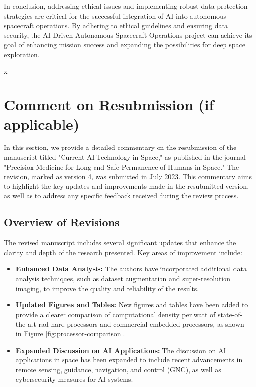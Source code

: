 \documentclass[a4paper,12pt]{article}
\begin{document}
In conclusion, addressing ethical issues and implementing robust data protection strategies are critical for the successful integration of AI into autonomous spacecraft operations. By adhering to ethical guidelines and ensuring data security, the AI-Driven Autonomous Spacecraft Operations project can achieve its goal of enhancing mission success and expanding the possibilities for deep space exploration.






x
\section{Comment on Resubmission (if applicable)}

In this section, we provide a detailed commentary on the resubmission of the manuscript titled "Current AI Technology in Space," as published in the journal "Precision Medicine for Long and Safe Permanence of Humans in Space." The revision, marked as version 4, was submitted in July 2023. This commentary aims to highlight the key updates and improvements made in the resubmitted version, as well as to address any specific feedback received during the review process.

\subsection{Overview of Revisions}

The revised manuscript includes several significant updates that enhance the clarity and depth of the research presented. Key areas of improvement include:

\begin{itemize}
    \item \textbf{Enhanced Data Analysis:} The authors have incorporated additional data analysis techniques, such as dataset augmentation and super-resolution imaging, to improve the quality and reliability of the results.
    \item \textbf{Updated Figures and Tables:} New figures and tables have been added to provide a clearer comparison of computational density per watt of state-of-the-art rad-hard processors and commercial embedded processors, as shown in Figure \ref{fig:processor-comparison}.
    \item \textbf{Expanded Discussion on AI Applications:} The discussion on AI applications in space has been expanded to include recent advancements in remote sensing, guidance, navigation, and control (GNC), as well as cybersecurity measures for AI systems.
\end{itemize}
\end{document}
